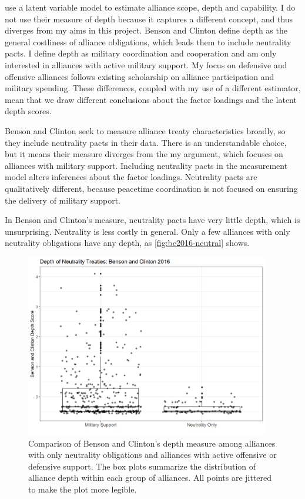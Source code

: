 \documentclass[12pt]{article}
\begin{document}
\citet{BensonClinton2016} use a latent variable model to estimate alliance scope, depth and capability. 
I do not use their measure of depth because it captures a different concept, and thus diverges from my aims in this project. 
Benson and Clinton define depth as the general costliness of alliance obligations, which leads them to include neutrality pacts. 
I define depth as military coordination and cooperation and am only interested in alliances with active military support. 
My focus on defensive and offensive alliances follows existing scholarship on alliance participation and military spending.
These differences, coupled with my use of a different estimator, mean that we draw different conclusions about the factor loadings and the latent depth scores.


Benson and Clinton seek to measure alliance treaty characteristics broadly, so they include neutrality pacts in their data. 
There is an understandable choice, but it means their measure diverges from the my argument, which focuses on alliances with military support. 
Including neutrality pacts in the measurement model alters inferences about the factor loadings. 
Neutrality pacts are qualitatively different, because peacetime coordination is not focused on ensuring the delivery of military support. 


In Benson and Clinton's measure, neutrality pacts have very little depth, which is unsurprising.
Neutrality is less costly in general.  
Only a few alliances with only neutrality obligations have any depth, as \autoref{fig:bc2016-neutral} shows.  

\begin{figure}[htbp]
	\centering
		\includegraphics[width=0.95\textwidth]{bc2016-neutral.png}
	\caption{Comparison of Benson and Clinton's depth measure among alliances with only neutrality obligations and alliances with active offensive or defensive support. The box plots summarize the distribution of alliance depth within each group of alliances. All points are jittered to make the plot more legible.}
	\label{fig:bc2016-neutral}
\end{figure}
\end{document}
